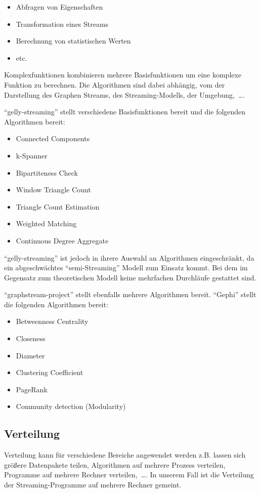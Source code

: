 \begin{itemize}
\item Abfragen von Eigenschaften
\item Transformation eines Streams
\item Berechnung von statistischen Werten
\item etc.
\end{itemize}

Komplexfunktionen kombinieren mehrere Basisfunktionen um eine komplexe Funktion
zu berechnen. Die Algorithmen sind dabei abhängig, vom der Darstellung
des Graphen Streams, des Streaming-Modells, der Umgebung,~\dots .

\enquote{gelly-streaming} stellt verschiedene Basisfunktionen bereit und die
folgenden Algorithmen bereit: \cite{Kalavri2018}

\begin{itemize}
\item Connected Components
\item k-Spanner
\item Bipartiteness Check
\item Window Triangle Count
\item Triangle Count Estimation
\item Weighted Matching
\item Continuous Degree Aggregate
\end{itemize}

\enquote{gelly-streaming} ist jedoch in ihrere Auswahl an Algorithmen eingeschränkt,
da ein abgeschwächtes \enquote{semi-Streaming} Modell zum Einsatz kommt. Bei dem
im Gegensatz zum theoretischen Modell keine mehrfachen Durchläufe gestattet sind.

\enquote{graphstream-project} stellt ebenfalls mehrere Algorithmen bereit.
\enquote{Gephi} stellt die folgenden Algorithmen bereit:

\begin{itemize}
\item Betweenness Centrality
\item Closeness
\item Diameter
\item Clustering Coefficient
\item PageRank
\item Community detection (Modularity)
\end{itemize}

\subsection{Verteilung}
Verteilung kann für verschiedene Bereiche angewendet werden z.B. lassen sich
größere Datenpakete teilen, Algorithmen auf mehrere Prozess verteilen, Programme
auf mehrere Rechner verteilen,~\dots . In unserem Fall ist die Verteilung der
Streaming-Programme auf mehrere Rechner gemeint.

